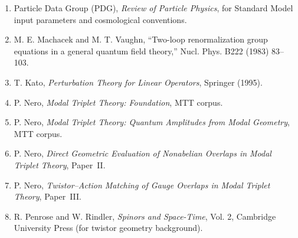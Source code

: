 \documentclass[11pt]{article}
\begin{document}
\begin{enumerate}

\item Particle Data Group (PDG), \emph{Review of Particle Physics},
for Standard Model input parameters and cosmological conventions.

\item M. E. Machacek and M. T. Vaughn,
``Two-loop renormalization group equations in a general quantum field theory,''
Nucl. Phys. B222 (1983) 83--103.

\item T. Kato, \emph{Perturbation Theory for Linear Operators},
Springer (1995).

\item P. Nero,
\emph{Modal Triplet Theory: Foundation},
MTT corpus.

\item P. Nero,
\emph{Modal Triplet Theory: Quantum Amplitudes from Modal Geometry},
MTT corpus.

\item P. Nero,
\emph{Direct Geometric Evaluation of Nonabelian Overlaps in Modal Triplet Theory},
Paper~II.

\item P. Nero,
\emph{Twistor--Action Matching of Gauge Overlaps in Modal Triplet Theory},
Paper~III.

\item R. Penrose and W. Rindler,
\emph{Spinors and Space-Time}, Vol. 2,
Cambridge University Press (for twistor geometry background).

\end{enumerate}
\end{document}
